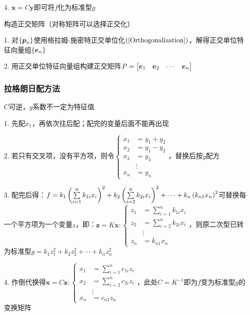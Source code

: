 \documentclass{article}
\begin{document}
4. $\boldsymbol x=C\boldsymbol y$即可将$f$化为标准型$g$

构造正交矩阵（对称矩阵可以选择正交化）

1. 对$\{\boldsymbol p_n\}$使用格拉姆-施密特正交单位化$\left(\ref{Orthogonalization}\right)$，解得正交单位特征向量组$\{\boldsymbol e_n\}$

2. 用正交单位特征向量组构建正交矩阵$P=\begin{bmatrix}\boldsymbol e_1&\boldsymbol e_2&\cdots&\boldsymbol e_n\end{bmatrix}$


\subsubsection{拉格朗日配方法}

$C$可逆，$g$系数不一定为特征值

1. 先配$x_1$，再依次往后配；配完的变量后面不能再出现

2. 若只有交叉项，没有平方项，则令$\left\{\begin{aligned}
        x_1 & =y_1+y_2 \\
        x_2 & =y_1-y_2 \\
        x_3 & =y_3     \\
            & \vdots   \\
        x_n & =y_n
    \end{aligned}\right.$，替换后按$y$配方

3. 配完后得：$f=k_1\left(\sum\limits_{i=1}^nk_{1i}x_i\right)^2+
    k_2\left(\sum\limits_{i=2}^nk_{2i}x_i\right)^2+\cdots+
    k_n\left(k_{n1}x_n\right)^2$可替换每一个平方项为一个变量$z$，即：$\boldsymbol z=K\boldsymbol x:\left\{\begin{aligned}
        z_1 & =\sum_{i=1}^nk_{1i}x_i \\
        z_2 & =\sum_{i=2}^nk_{2i}x_i \\
            & \vdots                 \\
        z_n & =k_{n1}x_n
    \end{aligned}\right.$，则原二次型已转为标准型$g=k_1z_1^2+k_2z_2^2+\cdots+k_nz_n^2$

4. 作倒代换得$\boldsymbol x=C\boldsymbol z:\left\{\begin{aligned}
        x_1 & =\sum_{i=1}^nc_{1i}z_i \\
        x_2 & =\sum_{i=2}^nc_{2i}z_i \\
            & \vdots                 \\
        x_n & =c_{n1}z_n
    \end{aligned}\right.$，此处$C=K^{-1}$即为$f$变为标准型$g$的变换矩阵
\end{document}
